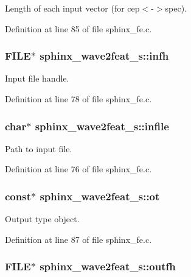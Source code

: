 Length of each input vector (for cep$<$-\/$>$spec). 



Definition at line 85 of file sphinx\-\_\-fe.\-c.

\subsubsection[{infh}]{\setlength{\rightskip}{0pt plus 5cm}F\-I\-L\-E$\ast$ sphinx\-\_\-wave2feat\-\_\-s\-::infh}\label{structsphinx__wave2feat__s_ad86834e597d4677aed93e7c06cebccb7}


Input file handle. 



Definition at line 78 of file sphinx\-\_\-fe.\-c.

\subsubsection[{infile}]{\setlength{\rightskip}{0pt plus 5cm}char$\ast$ sphinx\-\_\-wave2feat\-\_\-s\-::infile}\label{structsphinx__wave2feat__s_a6d4d1b1be4e3a3c1de82943e9e6fa65c}


Path to input file. 



Definition at line 76 of file sphinx\-\_\-fe.\-c.

\subsubsection[{ot}]{ const$\ast$ sphinx\-\_\-wave2feat\-\_\-s\-::ot}\label{structsphinx__wave2feat__s_a929e05e041ad922f6a2e35637a98c917}


Output type object. 



Definition at line 87 of file sphinx\-\_\-fe.\-c.

\subsubsection[{outfh}]{\setlength{\rightskip}{0pt plus 5cm}F\-I\-L\-E$\ast$ sphinx\-\_\-wave2feat\-\_\-s\-::outfh}\label{structsphinx__wave2feat__s_ad7340fab24fb182cbff2c73fd1fb3671}


